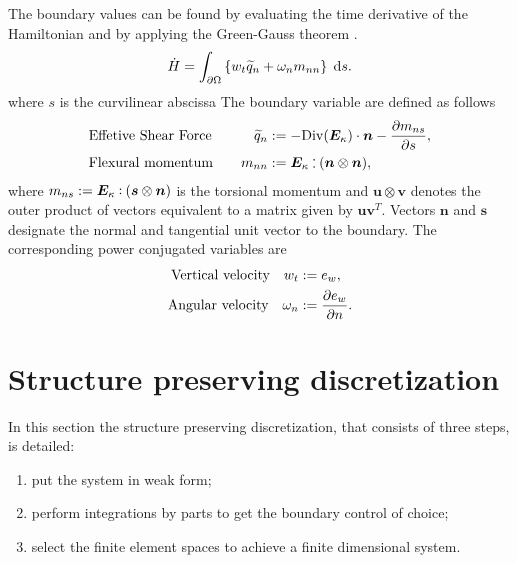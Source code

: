 \documentclass[letterpaper, 10 pt, conference]{ieeeconf}
\def\onedot{$\mathsurround0pt\ldotp$}
\def\cddot{%
	\mathbin{\vcenter{\baselineskip.67ex
			\hbox{\onedot}\hbox{\onedot}}%
}}
\begin{document}
The boundary values can be found by evaluating the time derivative of the Hamiltonian and by applying the Green-Gauss theorem \cite{BrugnoliKir}.
\begin{equation}
\begin{aligned}
\dot{H}= \int_{\partial \Omega} \left\{ w_t \widetilde{q}_n  + \omega_n m_{nn}\right\} \d{s}.  \\
\end{aligned}
\end{equation}
where $s$ is the curvilinear abscissa 
The boundary variable are defined as follows
\begin{equation}
\label{eq:QnMnnMns}
\begin{aligned}
&\text{Effetive Shear Force}  \quad &\widetilde{q}_{n} &:=  -\mathrm{Div}(\bm{E}_{\kappa}) \cdot \bm{n} - \diffp{m_{ns}}{s},  \\
&\text{Flexural momentum} \quad  &m_{nn} &:=   \bm{E}_{\kappa} \cddot (\bm{n}\otimes{\bm{n}}),	
\end{aligned}
\end{equation}
where $m_{ns} :=  \bm{E}_{\kappa} \cddot (\bm{s} \otimes{\bm{n}})$ is the torsional momentum and $\bm{u} \otimes {\bm{v}}$ denotes the outer product of vectors equivalent to a matrix given by $\bm{u}\bm{v}^T$. Vectors $\bm{n}$ and $\bm{s}$ designate the normal and tangential unit vector to the boundary. The corresponding power conjugated variables are
\begin{equation}
\label{eq:wtwnws}
\begin{aligned}
\text{Vertical velocity}  \quad w_t &:= e_w, \\
\text{Angular velocity} \quad \omega_{n} &:=  \diffp{e_w}{n}.
\end{aligned}
\end{equation}

\section{Structure preserving discretization}
\label{sec:SP_discr}
In this section the structure preserving discretization, that consists of three steps, is detailed: 
\begin{enumerate}
	\item put the system in weak form;
	\item perform integrations by parts to get the boundary control of choice;
	\item select the finite element spaces to achieve a finite dimensional system.
\end{enumerate}
\end{document}
